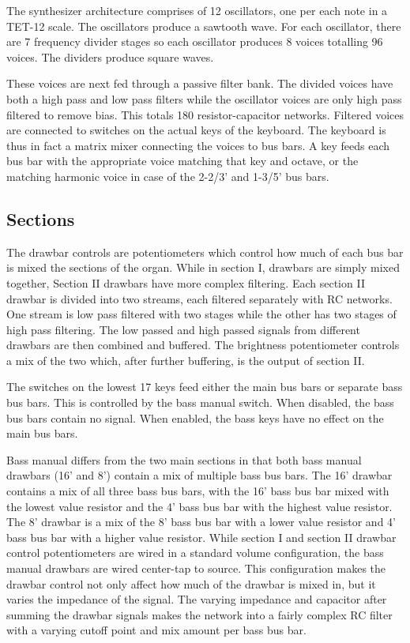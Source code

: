 \documentclass[11pt,a4paper]{article}
\begin{document}
The synthesizer architecture comprises of 12 oscillators, one per each note in a TET-12 scale. The oscillators produce a sawtooth wave. For each oscillator, there are 7 frequency divider stages so each oscillator produces 8 voices totalling 96 voices. The dividers produce square waves. 

These voices are next fed through a passive filter bank. The divided voices have both a high pass and low pass filters while the oscillator voices are only high pass filtered to remove bias. This totals 180 resistor-capacitor networks. Filtered voices are connected to switches on the actual keys of the keyboard. The keyboard is thus in fact a matrix mixer connecting the voices to bus bars. A key feeds each bus bar with the appropriate voice matching that key and octave, or the matching harmonic voice in case of the 2-2/3' and 1-3/5' bus bars. 

\subsection{Sections}
\label{section:sections}
The drawbar controls are potentiometers which control how much of each bus bar is mixed the sections of the organ. While in section I, drawbars are simply mixed together, Section II drawbars have more complex filtering. Each section II drawbar is divided into two streams, each filtered separately with RC networks. One stream is low pass filtered with two stages while the other has two stages of high pass filtering. The low passed and high passed signals from different drawbars are then combined and buffered. The brightness potentiometer controls a mix of the two which, after further buffering, is the output of section II. 

The switches on the lowest 17 keys feed either the main bus bars or separate bass bus bars. This is controlled by the bass manual switch. When disabled, the bass bus bars contain no signal. When enabled, the bass keys have no effect on the main bus bars.

Bass manual differs from the two main sections in that both bass manual drawbars (16' and 8') contain a mix of multiple bass bus bars. The 16' drawbar contains a mix of all three bass bus bars, with the 16' bass bus bar mixed with the lowest value resistor and the 4' bass bus bar with the highest value resistor. The 8' drawbar is a mix of the 8' bass bus bar with a lower value resistor and 4' bass bus bar with a higher value resistor. While section I and section II drawbar control potentiometers are wired in a standard volume configuration, the bass manual drawbars are wired center-tap to source. This configuration makes the drawbar control not only affect how much of the drawbar is mixed in, but it varies the impedance of the signal. The varying impedance and capacitor after summing the drawbar signals makes the network into a fairly complex RC filter with a varying cutoff point and mix amount per bass bus bar.
\end{document}
